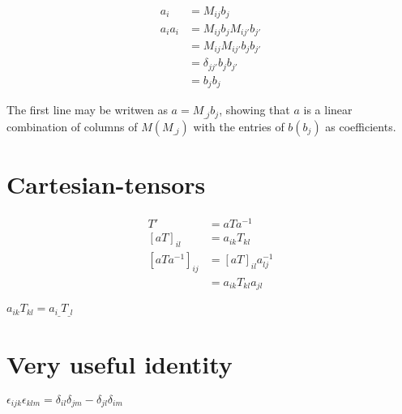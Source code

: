\documentclass{article}
\begin{document}
\begin{align}
a_i &= M_{ij}b_j \\
a_i a_i &= M_{ij}b_j M_{ij'}b_{j'} \\
&= M_{ij}M_{ij'} b_jb_{j'} \\
&= \delta_{jj'} b_jb_{j'} \\
&= b_jb_j
\end{align}

The first line may be writwen as $a = M_{\_j} b_j$, showing that $a$ is a linear combination of columns of $M (M_{\_j})$ with the entries of $b (b_j)$ as coefficients.

\section{Cartesian-tensors}

\begin{align}
T' &= aTa^{-1} \\
[aT]_{il} &= a_{ik}T_{kl} \\
[aTa^{-1}]_{ij} &= [aT]_{il} a^{-1}_{lj} \\
&= a_{ik}T_{kl}a_{jl}
\end{align}

$a_{ik}T_{kl} = a_{i\_} T_{\_l}$

\section{Very useful identity}
$\epsilon_{ijk}\epsilon_{klm} = \delta_{il}\delta_{jm} - \delta_{jl}\delta_{im}$
\end{document}
